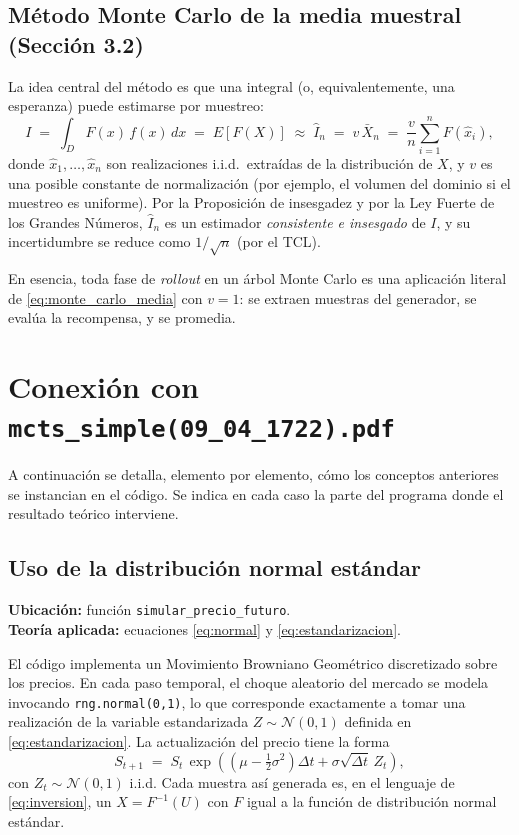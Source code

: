 \documentclass[11pt,a4paper]{article}
\theoremstyle{definition}
\begin{document}
\subsection{Método Monte Carlo de la media muestral (Sección 3.2)}

La idea central del método es que una integral (o, equivalentemente, una esperanza) puede estimarse por muestreo:
\begin{equation}
I \;=\; \int_D F(x)\,f(x)\,dx \;=\; E[F(X)]
\;\approx\;
\hat{I}_n \;=\; v\,\bar{X}_n \;=\; \frac{v}{n}\sum_{i=1}^{n} F(\hat{x}_i),
\label{eq:monte_carlo_media}
\end{equation}
donde $\hat{x}_1,\dots,\hat{x}_n$ son realizaciones i.i.d.\ extraídas de la distribución de $X$, y $v$ es una posible constante de normalización (por ejemplo, el volumen del dominio si el muestreo es uniforme). Por la Proposición de insesgadez y por la Ley Fuerte de los Grandes Números, $\hat{I}_n$ es un estimador \emph{consistente e insesgado} de $I$, y su incertidumbre se reduce como $1/\sqrt{n}$ (por el TCL).

En esencia, toda fase de \emph{rollout} en un árbol Monte Carlo es una aplicación literal de \eqref{eq:monte_carlo_media} con $v=1$: se extraen muestras del generador, se evalúa la recompensa, y se promedia.

\section{Conexión con \texttt{mcts\_simple(09\_04\_1722).pdf}}

A continuación se detalla, elemento por elemento, cómo los conceptos anteriores se instancian en el código. Se indica en cada caso la parte del programa donde el resultado teórico interviene.

\subsection{Uso de la distribución normal estándar}

\textbf{Ubicación:} función \texttt{simular\_precio\_futuro}.\\
\textbf{Teoría aplicada:} ecuaciones \eqref{eq:normal} y \eqref{eq:estandarizacion}.

El código implementa un Movimiento Browniano Geométrico discretizado sobre los precios. En cada paso temporal, el choque aleatorio del mercado se modela invocando \texttt{rng.normal(0,1)}, lo que corresponde exactamente a tomar una realización de la variable estandarizada $Z\sim\mathcal{N}(0,1)$ definida en \eqref{eq:estandarizacion}. La actualización del precio tiene la forma
\[
S_{t+1} \;=\; S_t\,\exp\!\left(\left(\mu-\tfrac{1}{2}\sigma^2\right)\Delta t + \sigma\sqrt{\Delta t}\,Z_t\right),
\]
con $Z_t\sim\mathcal{N}(0,1)$ i.i.d. Cada muestra así generada es, en el lenguaje de \eqref{eq:inversion}, un $X=F^{-1}(U)$ con $F$ igual a la función de distribución normal estándar.
\end{document}

